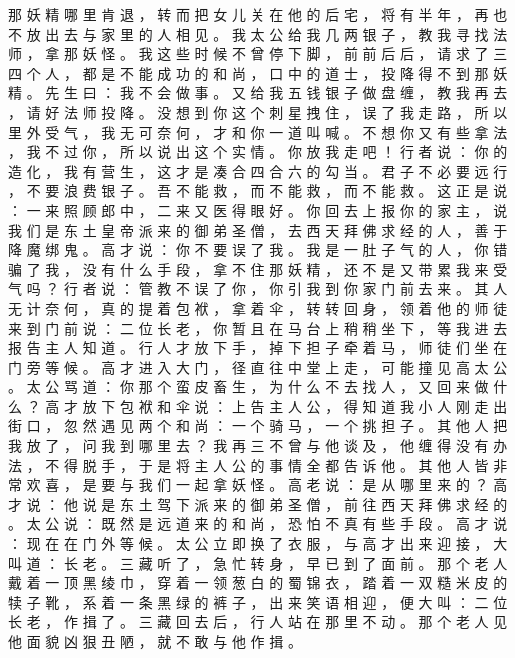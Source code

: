 {那 妖 精 哪 里 肯 退 ， 转 而 把 女 儿 关 在 他 的 后 宅 ， 将 有 半 年 ， 再 也 不 放 出 去 与 家 里 的 人 相 见 。
我 太 公 给 我 几 两 银 子 ， 教 我 寻 找 法 师 ， 拿 那 妖 怪 。
我 这 些 时 候 不 曾 停 下 脚 ， 前 前 后 后 ， 请 求 了 三 四 个 人 ， 都 是 不 能 成 功 的 和 尚 ， 口 中 的 道 士 ， 投 降 得 不 到 那 妖 精 。
先 生 曰 ： 我 不 会 做 事 。
又 给 我 五 钱 银 子 做 盘 缠 ， 教 我 再 去 ， 请 好 法 师 投 降 。
没 想 到 你 这 个 刺 星 拽 住 ， 误 了 我 走 路 ， 所 以 里 外 受 气 ， 我 无 可 奈 何 ， 才 和 你 一 道 叫 喊 。
不 想 你 又 有 些 拿 法 ， 我 不 过 你 ， 所 以 说 出 这 个 实 情 。
你 放 我 走 吧 ！
行 者 说 ： 你 的 造 化 ， 我 有 营 生 ， 这 才 是 凑 合 四 合 六 的 勾 当 。
君 子 不 必 要 远 行 ， 不 要 浪 费 银 子 。
吾 不 能 救 ， 而 不 能 救 ， 而 不 能 救 。
这 正 是 说 ： 一 来 照 顾 郎 中 ， 二 来 又 医 得 眼 好 。
你 回 去 上 报 你 的 家 主 ， 说 我 们 是 东 土 皇 帝 派 来 的 御 弟 圣 僧 ， 去 西 天 拜 佛 求 经 的 人 ， 善 于 降 魔 绑 鬼 。
高 才 说 ： 你 不 要 误 了 我 。
我 是 一 肚 子 气 的 人 ， 你 错 骗 了 我 ， 没 有 什 么 手 段 ， 拿 不 住 那 妖 精 ， 还 不 是 又 带 累 我 来 受 气 吗 ？ 行 者 说 ： 管 教 不 误 了 你 ， 你 引 我 到 你 家 门 前 去 来 。
其 人 无 计 奈 何 ， 真 的 提 着 包 袱 ， 拿 着 伞 ， 转 转 回 身 ， 领 着 他 的 师 徒 来 到 门 前 说 ： 二 位 长 老 ， 你 暂 且 在 马 台 上 稍 稍 坐 下 ， 等 我 进 去 报 告 主 人 知 道 。
行 人 才 放 下 手 ， 掉 下 担 子 牵 着 马 ， 师 徒 们 坐 在 门 旁 等 候 。
高 才 进 入 大 门 ， 径 直 往 中 堂 上 走 ， 可 能 撞 见 高 太 公 。
太 公 骂 道 ： 你 那 个 蛮 皮 畜 生 ， 为 什 么 不 去 找 人 ， 又 回 来 做 什 么 ？ 高 才 放 下 包 袱 和 伞 说 ： 上 告 主 人 公 ， 得 知 道 我 小 人 刚 走 出 街 口 ， 忽 然 遇 见 两 个 和 尚 ： 一 个 骑 马 ， 一 个 挑 担 子 。
其 他 人 把 我 放 了 ， 问 我 到 哪 里 去 ？
我 再 三 不 曾 与 他 谈 及 ， 他 缠 得 没 有 办 法 ， 不 得 脱 手 ， 于 是 将 主 人 公 的 事 情 全 都 告 诉 他 。
其 他 人 皆 非 常 欢 喜 ， 是 要 与 我 们 一 起 拿 妖 怪 。
高 老 说 ： 是 从 哪 里 来 的 ？ 高 才 说 ： 他 说 是 东 土 驾 下 派 来 的 御 弟 圣 僧 ， 前 往 西 天 拜 佛 求 经 的 。
太 公 说 ： 既 然 是 远 道 来 的 和 尚 ， 恐 怕 不 真 有 些 手 段 。
高 才 说 ： 现 在 在 门 外 等 候 。
太 公 立 即 换 了 衣 服 ， 与 高 才 出 来 迎 接 ， 大 叫 道 ： 长 老 。
三 藏 听 了 ， 急 忙 转 身 ， 早 已 到 了 面 前 。
那 个 老 人 戴 着 一 顶 黑 绫 巾 ， 穿 着 一 领 葱 白 的 蜀 锦 衣 ， 踏 着 一 双 糙 米 皮 的 犊 子 靴 ， 系 着 一 条 黑 绿 的 裤 子 ， 出 来 笑 语 相 迎 ， 便 大 叫 ： 二 位 长 老 ， 作 揖 了 。
三 藏 回 去 后 ， 行 人 站 在 那 里 不 动 。
那 个 老 人 见 他 面 貌 凶 狠 丑 陋 ， 就 不 敢 与 他 作 揖 。
}
